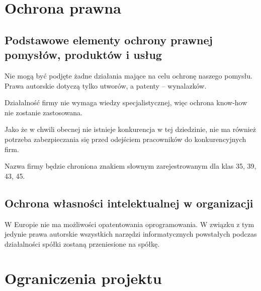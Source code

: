 \documentclass{article}
\begin{document}
\section{Ochrona prawna}
\subsection{Podstawowe elementy ochrony prawnej pomysłów, produktów i usług}
Nie mogą być podjęte żadne działania mające na celu ochronę naszego pomysłu. Prawa autorskie dotyczą tylko utworów, a patenty -- wynalazków. 

Działalność firmy nie wymaga wiedzy specjalistycznej, więc ochrona know-how nie zostanie zastosowana.

Jako że w chwili obecnej nie istnieje konkurencja w tej dziedzinie, nie ma również potrzeba zabezpieczania się przed odejściem pracowników do konkurencyjnych firm.

Nazwa firmy będzie chroniona znakiem słownym zarejestrowanym dla klas 35, 39, 43, 45.
\subsection{Ochrona własności intelektualnej w organizacji}
W Europie nie ma możliwości opatentowania oprogramowania. W związku z tym jedynie prawa autorskie wszystkich narzędzi informatycznych powstałych podczas działalności spółki zostaną przeniesione na spółkę.

\section{Ograniczenia projektu}





\end{document}
